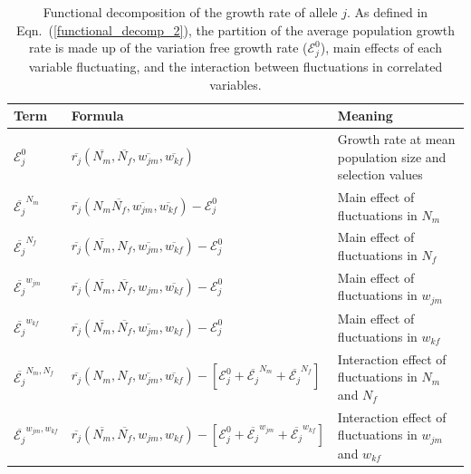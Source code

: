 \documentclass[12pt]{article}
\begin{document}
\begin{table}[h]
\fontsize{7}{12}\selectfont %
    \centering
      \caption{Functional decomposition of the growth rate of allele $j$. As defined in Eqn.~(\ref{functional_decomp_2}), the partition of the average population growth rate is made up of the variation free growth rate ($\mathcal{E}^{0}_{j}$), main effects of each variable fluctuating, and the interaction between fluctuations in correlated variables. }
  \resizebox{\textwidth}{!} {\begin{tabular}{l|l|l}
  \toprule
        Term & Formula & Meaning \\
        \hline
         $\mathcal{E}^{0}_{j}$ & $\overline{r_{j}} (\overline{N_{m}}, \overline{N_{f}}, \overline{w_{jm}}, \overline{w_{kf}})$ & Growth rate at mean population size and selection values \\


         $\overline{\mathcal{E}_{j}}^{N_{m}}$ & $\overline{r_{j}}(N_{m} \overline{N_{f}}, \overline{w_{jm}}, \overline{w_{kf}}) - \mathcal{E}^{0}_{j} $ & Main effect of fluctuations in $N_{m}$\\

         $\overline{\mathcal{E}_{j}}^{N_{f}}$ & $ \overline{r_{j}}( \overline{N_{m}}, N_{f},\overline{w_{jm}}, \overline{w_{kf}}) - \mathcal{E}^{0}_{j}$ & Main effect of fluctuations in $N_{f}$ \\

        $\overline{\mathcal{E}_{j}}^{w_{jm}}$ & $ \overline{r_{j}}(\overline{N_{m}}, \overline{N_{f}}, w_{jm}, \overline{w_{kf}}) - \mathcal{E}^{0}_{j}$& Main effect of fluctuations in $w_{jm}$\\

        $\overline{\mathcal{E}_{j}}^{w_{kf}}$ & $ \overline{r_{j}}(\overline{N_{m}}, \overline{N_{f}}, \overline{w_{jm}}, w_{kf})- \mathcal{E}^{0}_{j}$ & Main effect of fluctuations in $w_{kf}$\\

        $\overline{\mathcal{E}_{j}}^{N_{m},N_{f}}$ & $ \overline{r_{j}}(N_{m}, N_{f}, \overline{w_{jm}}, \overline{w_{kf}})- [\mathcal{E}^{0}_{j} +\overline{\mathcal{E}_{j}}^{N_{m}}+\overline{\mathcal{E}_{j}}^{N_{f}}]$ & Interaction effect of fluctuations in $N_{m}$ and $N_{f}$\\

        $\overline{\mathcal{E}_{j}}^{w_{jm},w_{kf}}$ & $ \overline{r_{j}}(\overline{N_{m}}, \overline{N_{f}}, w_{jm}, w_{kf})- [\mathcal{E}^{0}_{j} +\overline{\mathcal{E}_{j}}^{w_{jm}}+\overline{\mathcal{E}_{j}}^{w_{kf}}]$ & Interaction effect of fluctuations in $w_{jm}$ and $w_{kf}$ \\


\end{tabular}}
\end{table}
\end{document}
